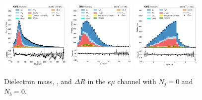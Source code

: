 \begin{figure}[htb!]
    \centering
    \includegraphics[width=0.3\textwidth]{chapters/Appendix/sectionPlots/figures/data_mc_overlays/emu_2016_cat_eq1_eq0_a_signal_linear_lepton_dilepton1_mass}
    \includegraphics[width=0.3\textwidth]{chapters/Appendix/sectionPlots/figures/data_mc_overlays/emu_2016_cat_eq1_eq0_a_signal_linear_lepton_dilepton1_pt}
    \includegraphics[width=0.3\textwidth]{chapters/Appendix/sectionPlots/figures/data_mc_overlays/emu_2016_cat_eq1_eq0_a_signal_linear_lepton_dilepton1_delta_r}
    \caption{Dielectron mass, \pt, and $\Delta R$ in the $e\mu$ channel
    with $N_{j} = 0$ and $N_{b} = 0$.}
    \label{fig:emu_2_dilepton}
\end{figure}

